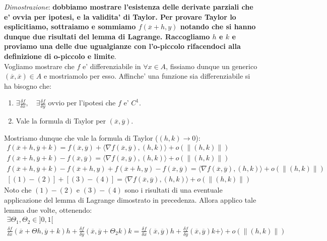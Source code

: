 \documentclass{article}
\begin{document}
\noindent \emph{Dimostrazione}: \textbf{dobbiamo mostrare l'esistenza delle derivate
parziali che e' ovvia per ipotesi, e la validita' di Taylor. Per provare Taylor lo
esplicitiamo, sottraiamo e sommiamo $f(\overline{x}+h, y)$ notando che si hanno dunque
due risultati del lemma di Lagrange. Raccogliamo $h$ e $k$ e proviamo una delle due
ugualgianze con l'o-piccolo rifacendoci alla definizione di o-piccolo e limite}. \\
Vogliamo mostrare che $f$ e' differenziabile in $\forall x \in A$, fissiamo dunque
un generico $(\overline{x}, \overline{x}) \in A$ e mostriamolo per esso. Affinche'
una funzione sia differenziabile si ha bisogno che:
\begin{enumerate}
  \item $\exists \frac{\delta f}{\delta x}, \quad \exists \frac{\delta f}{\delta y}$ ovvio
  per l'ipotesi che $f$ e' $C^1$.
  \item Vale la formula di Taylor per $(\overline{x}, \overline{y})$.
\end{enumerate}
Mostriamo dunque che vale la formula di Taylor ($(h,k) \to 0$):
\begin{align*}
  f(\overline{x} + h, \overline{y} + k) = f(\overline{x}, \overline{y}) +
  \langle \nabla f(\overline{x}, \overline{y}), (h,k) \rangle + o(\|(h,k)\|) \\
  f(\overline{x} + h, \overline{y} + k) - f(\overline{x}, \overline{y}) = 
  \langle \nabla f(\overline{x}, \overline{y}), (h,k) \rangle + o(\|(h,k)\|) \\
  f(\overline{x} + h, \overline{y} + k) - f(\overline{x}+h, y) + f(\overline{x}+h, y) - f(\overline{x}, \overline{y}) = 
  \langle \nabla f(\overline{x}, \overline{y}), (h,k) \rangle + o(\|(h,k)\|) \\
  [(1) - (2)] + [(3) - (4)] = \langle \nabla f(\overline{x}, \overline{y}), (h,k) \rangle + o(\|(h,k)\|)
\end{align*}
Noto che $(1) - (2)$ e $(3) - (4)$ sono i risultati di una eventuale applicazione
del lemma di Lagrange dimostrato in precedenza. Allora applico tale lemma due volte, ottenendo:
\begin{align*}
  \exists \Theta_1, \Theta_2 \in ]0,1[ \\
  \frac{\delta f}{\delta x}(\overline{x} + \Theta h, \overline{y} + k)h +
  \frac{\delta f}{\delta y}(\overline{x}, \overline{y} + \Theta_2k)k =
  \frac{\delta f}{\delta x}(\overline{x}, \overline{y})h +
  \frac{\delta f}{\delta y}(\overline{x}, \overline{y})k +  \rangle + o(\|(h,k)\|)
\end{align*}
\end{document}
